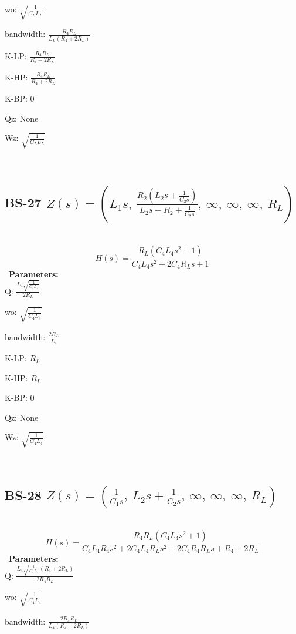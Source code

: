 \documentclass{article}
\begin{document}
wo: $\sqrt{\frac{1}{C_{L} L_{L}}}$\ 

bandwidth: $\frac{R_{4} R_{L}}{L_{L} \left(R_{4} + 2 R_{L}\right)}$\ 

K-LP: $\frac{R_{4} R_{L}}{R_{4} + 2 R_{L}}$\ 

K-HP: $\frac{R_{4} R_{L}}{R_{4} + 2 R_{L}}$\ 

K-BP: $0$\ 

Qz: $\text{None}$\ 

Wz: $\sqrt{\frac{1}{C_{L} L_{L}}}$\ 

\ 

\subsection{BS-27 $Z(s) = \left( L_{1} s, \  \frac{R_{2} \left(L_{2} s + \frac{1}{C_{2} s}\right)}{L_{2} s + R_{2} + \frac{1}{C_{2} s}}, \  \infty, \  \infty, \  \infty, \  R_{L}\right)$ } \ 
\textbf{\[H(s) = \frac{R_{L} \left(C_{4} L_{4} s^{2} + 1\right)}{C_{4} L_{4} s^{2} + 2 C_{4} R_{L} s + 1}\] } \ 
\textbf{Parameters:}\\ 

Q: $\frac{L_{4} \sqrt{\frac{1}{C_{4} L_{4}}}}{2 R_{L}}$\ 

wo: $\sqrt{\frac{1}{C_{4} L_{4}}}$\ 

bandwidth: $\frac{2 R_{L}}{L_{4}}$\ 

K-LP: $R_{L}$\ 

K-HP: $R_{L}$\ 

K-BP: $0$\ 

Qz: $\text{None}$\ 

Wz: $\sqrt{\frac{1}{C_{4} L_{4}}}$\ 

\ 

\subsection{BS-28 $Z(s) = \left( \frac{1}{C_{1} s}, \  L_{2} s + \frac{1}{C_{2} s}, \  \infty, \  \infty, \  \infty, \  R_{L}\right)$ } \ 
\textbf{\[H(s) = \frac{R_{4} R_{L} \left(C_{4} L_{4} s^{2} + 1\right)}{C_{4} L_{4} R_{4} s^{2} + 2 C_{4} L_{4} R_{L} s^{2} + 2 C_{4} R_{4} R_{L} s + R_{4} + 2 R_{L}}\] } \ 
\textbf{Parameters:}\\ 

Q: $\frac{L_{4} \sqrt{\frac{1}{C_{4} L_{4}}} \left(R_{4} + 2 R_{L}\right)}{2 R_{4} R_{L}}$\ 

wo: $\sqrt{\frac{1}{C_{4} L_{4}}}$\ 

bandwidth: $\frac{2 R_{4} R_{L}}{L_{4} \left(R_{4} + 2 R_{L}\right)}$\ 
\end{document}

